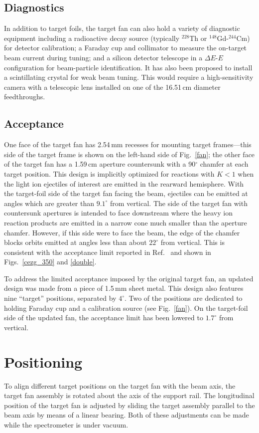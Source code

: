 \subsection{Diagnostics}
In addition to target foils, the target fan can also hold a variety of diagnostic equipment including a radioactive decay source (typically $^{228}$Th or $^{148}$Gd-$^{244}$Cm) for detector calibration; a Faraday cup and collimator to measure the on-target beam current during tuning; and a silicon detector telescope in a $\Delta E$-$E$ configuration for beam-particle identification.  It has also been proposed to install a scintillating crystal for weak beam tuning.  This would require a high-sensitivity camera with a telescopic lens installed on one of the 16.51\,cm diameter feedthroughs.

\subsection{Acceptance}
One face of the target fan has 2.54\,mm recesses for mounting target frames---this side of the target frame is shown on the left-hand side of Fig.~\ref{fan}; the other face of the target fan has a 1.59\,cm aperture countersunk with a 90$^\circ$ chamfer at each target position.  This design is implicitly optimized for reactions with $K<1$ when the light ion ejectiles of interest are emitted in the rearward hemisphere.  With the target-foil side of the target fan facing the beam, ejectiles can be emitted at angles which are greater than $9.1^\circ$ from vertical.  The side of the target fan with countersunk apertures is intended to face downstream where the heavy ion reaction products are emitted in a narrow cone much smaller than the aperture chamfer.   However, if this side were to face the beam, the edge of the chamfer blocks orbits emitted at angles less than about $22^\circ$ from vertical.  This is consistent with the acceptance limit reported in Ref.~\cite{Lighthall_2010} and shown in Figs.~\ref{cezg_350} and \ref{double}.

To address the limited acceptance imposed by the original target fan, an updated design was made from a piece of 1.5\,mm sheet metal.  This design also features nine ``target'' positions, separated by $4^\circ$.  Two of the positions are dedicated to holding Faraday cup and a calibration source (see Fig.~\ref{fan}).  On the target-foil side of the updated fan, the acceptance limit has been lowered to $1.7^\circ$ from vertical.

\section{Positioning}
To align different target positions on the target fan with the beam axis, the target fan assembly is rotated about the axis of the support rail.  The longitudinal position of the target fan is adjusted by sliding the target assembly parallel to the beam axis %
by means of a linear bearing.  Both of these adjustments can be made while the spectrometer is under vacuum.
